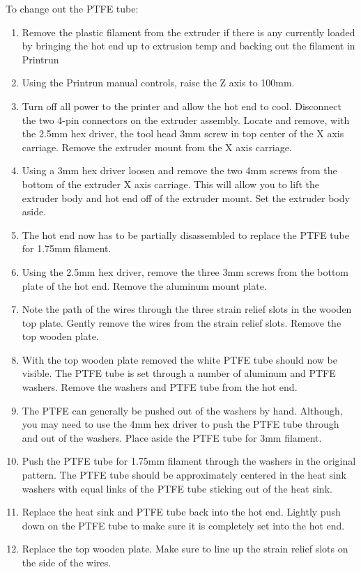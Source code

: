 To change out the PTFE tube:
\begin{enumerate}
\item Remove the plastic filament from the extruder if there is any currently loaded by bringing the hot end up to extrusion temp and backing out the filament in Printrun

\item Using the Printrun manual controls, raise the Z axis to 100mm.
\item Turn off all power to the printer and allow the hot end to cool. Disconnect the two 4-pin connectors on the extruder assembly. Locate and remove, with the 2.5mm hex driver, the tool head 3mm screw in top center of the X axis carriage. Remove the extruder mount from the X axis carriage.
\item Using a 3mm hex driver loosen and remove the two 4mm screws from the bottom of the extruder X axis carriage. This will allow you to lift the extruder body and hot end off of the extruder mount. Set the extruder body aside.
\item The hot end now has to be partially disassembled to replace the PTFE tube for 1.75mm filament. 
\item Using the 2.5mm hex driver, remove the three 3mm screws from the bottom plate of the hot end. Remove the aluminum mount plate.
\item Note the path of the wires through the three strain relief slots in the wooden top plate. Gently remove the wires from the strain relief slots. Remove the top wooden plate.
\item With the top wooden plate removed the white PTFE tube should now be visible. The PTFE tube is set through a number of aluminum and PTFE washers. Remove the washers and PTFE tube from the hot end.
\item The PTFE can generally be pushed out of the washers by hand. Although, you may need to use the 4mm hex driver to push the PTFE tube through and out of the washers. Place aside the PTFE tube for 3mm filament.
\item Push the PTFE tube for 1.75mm filament through the washers in the original pattern. The PTFE tube should be approximately centered in the heat sink washers with equal links of the PTFE tube sticking out of the heat sink.
\item Replace the heat sink and PTFE tube back into the hot end. Lightly push down on the PTFE tube to make sure it is completely set into the hot end.
\item Replace the top wooden plate. Make sure to line up the strain relief slots on the side of the wires.

\end{enumerate}
